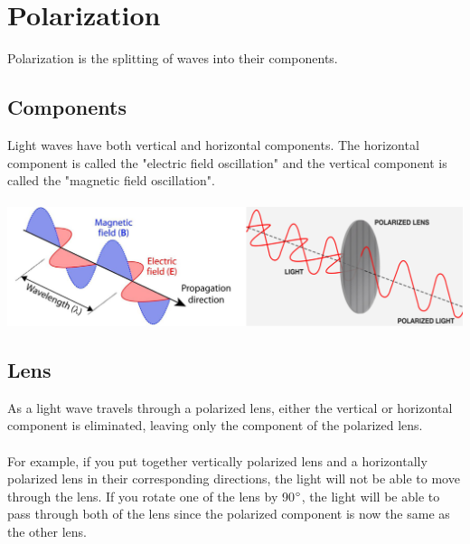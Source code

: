 \documentclass{article}
\begin{document}
\section{Polarization}
Polarization is the splitting of waves into their components.

\subsection{Components}
Light waves have both vertical and horizontal components. The horizontal component is called the "electric field oscillation" and the vertical component is called the "magnetic field oscillation".\\\\
\includegraphics[scale=0.45]{images/polarization} \\

\subsection{Lens}
\noindent As a light wave travels through a polarized lens, either the vertical or horizontal component is eliminated, leaving only the component of the polarized lens.\\\\
For example, if you put together vertically polarized lens and a horizontally polarized lens in their corresponding directions, the light will not be able to move through the lens.
If you rotate one of the lens by 90$\degree$, the light will be able to pass through both of the lens since the polarized component is now the same as the other lens.
\end{document}
